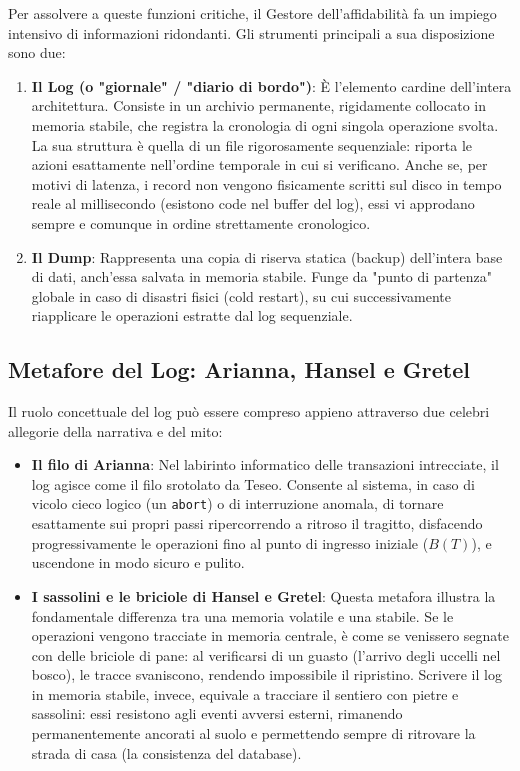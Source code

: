 Per assolvere a queste funzioni critiche, il Gestore dell'affidabilità fa un impiego intensivo di informazioni ridondanti. Gli strumenti principali a sua disposizione sono due:
\begin{enumerate}
    \item \textbf{Il Log (o "giornale" / "diario di bordo")}: È l'elemento cardine dell'intera architettura. Consiste in un archivio permanente, rigidamente collocato in memoria stabile, che registra la cronologia di ogni singola operazione svolta. La sua struttura è quella di un file rigorosamente sequenziale: riporta le azioni esattamente nell'ordine temporale in cui si verificano. Anche se, per motivi di latenza, i record non vengono fisicamente scritti sul disco in tempo reale al millisecondo (esistono code nel buffer del log), essi vi approdano sempre e comunque in ordine strettamente cronologico.
    \item \textbf{Il Dump}: Rappresenta una copia di riserva statica (backup) dell'intera base di dati, anch'essa salvata in memoria stabile. Funge da "punto di partenza" globale in caso di disastri fisici (cold restart), su cui successivamente riapplicare le operazioni estratte dal log sequenziale.
\end{enumerate}

\subsection{Metafore del Log: Arianna, Hansel e Gretel}
Il ruolo concettuale del log può essere compreso appieno attraverso due celebri allegorie della narrativa e del mito:
\begin{itemize}
    \item \textbf{Il filo di Arianna}: Nel labirinto informatico delle transazioni intrecciate, il log agisce come il filo srotolato da Teseo. Consente al sistema, in caso di vicolo cieco logico (un \texttt{abort}) o di interruzione anomala, di tornare esattamente sui propri passi ripercorrendo a ritroso il tragitto, disfacendo progressivamente le operazioni fino al punto di ingresso iniziale ($B(T)$), e uscendone in modo sicuro e pulito.
    \item \textbf{I sassolini e le briciole di Hansel e Gretel}: Questa metafora illustra la fondamentale differenza tra una memoria volatile e una stabile. Se le operazioni vengono tracciate in memoria centrale, è come se venissero segnate con delle briciole di pane: al verificarsi di un guasto (l'arrivo degli uccelli nel bosco), le tracce svaniscono, rendendo impossibile il ripristino. Scrivere il log in memoria stabile, invece, equivale a tracciare il sentiero con pietre e sassolini: essi resistono agli eventi avversi esterni, rimanendo permanentemente ancorati al suolo e permettendo sempre di ritrovare la strada di casa (la consistenza del database).
\end{itemize}

